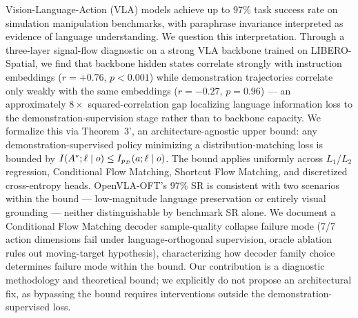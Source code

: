 
Vision-Language-Action (VLA) models achieve up to 97\% task success rate on simulation
manipulation benchmarks, with paraphrase invariance interpreted as evidence of language
understanding. We question this interpretation. Through a three-layer signal-flow diagnostic
on a strong VLA backbone trained on LIBERO-Spatial, we find that backbone hidden states
correlate strongly with instruction embeddings ($r = +0.76$, $p < 0.001$) while demonstration
trajectories correlate only weakly with the same embeddings ($r = -0.27$, $p = 0.96$) ---
an approximately $8\times$ squared-correlation gap localizing language information loss to
the demonstration-supervision stage rather than to backbone capacity. We formalize this via
Theorem~3', an architecture-agnostic upper bound: any demonstration-supervised policy
minimizing a distribution-matching loss is bounded by
$I(A^{*}; \ell \mid o) \le I_{p_{\mathcal{D}}}(a; \ell \mid o)$. The bound applies uniformly across
$L_1$/$L_2$ regression, Conditional Flow Matching, Shortcut Flow Matching, and discretized
cross-entropy heads. OpenVLA-OFT's 97\% SR is consistent with two scenarios within the
bound --- low-magnitude language preservation or entirely visual grounding --- neither
distinguishable by benchmark SR alone. We document a Conditional Flow Matching decoder
sample-quality collapse failure mode (7/7 action dimensions fail under language-orthogonal
supervision, oracle ablation rules out moving-target hypothesis), characterizing how
decoder family choice determines failure mode within the bound. Our contribution is a
diagnostic methodology and theoretical bound; we explicitly do not propose an architectural
fix, as bypassing the bound requires interventions outside the demonstration-supervised loss.

